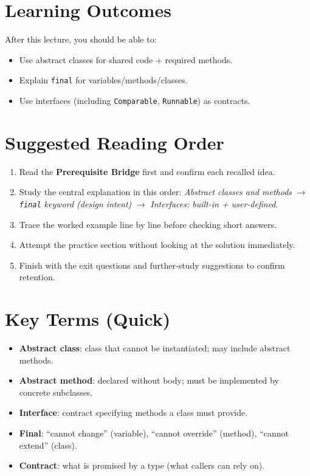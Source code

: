 \documentclass[11pt]{article}
\begin{document}
\section{Learning Outcomes}
After this lecture, you should be able to:
\begin{itemize}
  \item Use abstract classes for shared code + required methods.
  \item Explain \texttt{final} for variables/methods/classes.
  \item Use interfaces (including \texttt{Comparable}, \texttt{Runnable}) as contracts.
\end{itemize}

\section{Suggested Reading Order}
\begin{enumerate}
  \item Read the \textbf{Prerequisite Bridge} first and confirm each recalled idea.
  \item Study the central explanation in this order: \textit{Abstract classes and methods} $\rightarrow$ \textit{\texttt{final} keyword (design intent)} $\rightarrow$ \textit{Interfaces: built-in + user-defined}.
  \item Trace the worked example line by line before checking short answers.
  \item Attempt the practice section without looking at the solution immediately.
  \item Finish with the exit questions and further-study suggestions to confirm retention.
\end{enumerate}
\notesources{\OOPSUnitIISources}

\section{Key Terms (Quick)}
\begin{itemize}
  \item \textbf{Abstract class}: class that cannot be instantiated; may include abstract methods.
  \item \textbf{Abstract method}: declared without body; must be implemented by concrete subclasses.
  \item \textbf{Interface}: contract specifying methods a class must provide.
  \item \textbf{Final}: ``cannot change'' (variable), ``cannot override'' (method), ``cannot extend'' (class).
  \item \textbf{Contract}: what is promised by a type (what callers can rely on).
\end{itemize}
\end{document}
